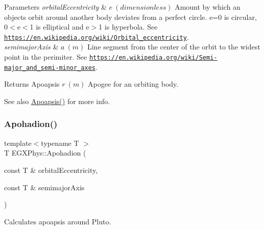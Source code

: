 \begin{DoxyParams}{Parameters}
{\em orbital\+Eccentricity} & $ e\ (dimensionless)$ Amount by which an objects orbit around another body deviates from a perfect circle. e=0 is circular, 0$<$e$<$1 is elliptical and e$>$1 is hyperbola. See \href{https://en.wikipedia.org/wiki/Orbital_eccentricity}{\tt https\+://en.\+wikipedia.\+org/wiki/\+Orbital\+\_\+eccentricity}. \\
\hline
{\em semimajor\+Axis} & $ a\ (m)$ Line segment from the center of the orbit to the widest point in the perimiter. See \href{https://en.wikipedia.org/wiki/Semi-major_and_semi-minor_axes}{\tt https\+://en.\+wikipedia.\+org/wiki/\+Semi-\/major\+\_\+and\+\_\+semi-\/minor\+\_\+axes}. \\
\hline
\end{DoxyParams}
\begin{DoxyReturn}{Returns}
Apoapsis $ r\ (m)$ Apogee for an orbiting body. 
\end{DoxyReturn}
\begin{DoxySeeAlso}{See also}
\mbox{\hyperlink{group___e_g_x_phys-_apoapsis_gaf962e650bf84a568458e8eb39b1c61ba}{Apoapsis()}} for more info. 
\end{DoxySeeAlso}
\mbox{\label{group___e_g_x_phys-_apoapsis_gaa16847ddc5763c327067075dcb6a3353}} 
\subsubsection{\texorpdfstring{Apohadion()}{Apohadion()}}
{\footnotesize\ttfamily template$<$typename T $>$ \\
T E\+G\+X\+Phys\+::\+Apohadion (\begin{DoxyParamCaption}\item[{const T \&}]{orbital\+Eccentricity,  }\item[{const T \&}]{semimajor\+Axis }\end{DoxyParamCaption})}



Calculates apoapsis around Pluto. 


